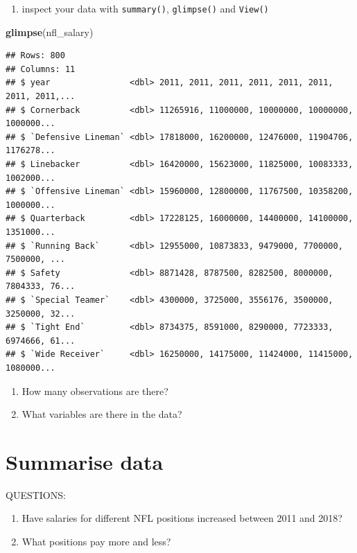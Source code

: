 \documentclass[
]{book}
\newenvironment{Shaded}{\begin{snugshade}}{\end{snugshade}}
\newcommand{\KeywordTok}[1]{\textcolor[rgb]{0.13,0.29,0.53}{\textbf{#1}}}
\newcommand{\NormalTok}[1]{#1}
\providecommand{\tightlist}{%
  \setlength{\itemsep}{0pt}\setlength{\parskip}{0pt}}
\begin{document}
\begin{enumerate}
\def\labelenumi{\arabic{enumi}.}
\setcounter{enumi}{3}
\tightlist
\item
  inspect your data with \texttt{summary()}, \texttt{glimpse()} and \texttt{View()}
\end{enumerate}

\begin{Shaded}
\begin{Highlighting}[]
\KeywordTok{glimpse}\NormalTok{(nfl_salary)}
\end{Highlighting}
\end{Shaded}

\begin{verbatim}
## Rows: 800
## Columns: 11
## $ year                <dbl> 2011, 2011, 2011, 2011, 2011, 2011, 2011, 2011,...
## $ Cornerback          <dbl> 11265916, 11000000, 10000000, 10000000, 1000000...
## $ `Defensive Lineman` <dbl> 17818000, 16200000, 12476000, 11904706, 1176278...
## $ Linebacker          <dbl> 16420000, 15623000, 11825000, 10083333, 1002000...
## $ `Offensive Lineman` <dbl> 15960000, 12800000, 11767500, 10358200, 1000000...
## $ Quarterback         <dbl> 17228125, 16000000, 14400000, 14100000, 1351000...
## $ `Running Back`      <dbl> 12955000, 10873833, 9479000, 7700000, 7500000, ...
## $ Safety              <dbl> 8871428, 8787500, 8282500, 8000000, 7804333, 76...
## $ `Special Teamer`    <dbl> 4300000, 3725000, 3556176, 3500000, 3250000, 32...
## $ `Tight End`         <dbl> 8734375, 8591000, 8290000, 7723333, 6974666, 61...
## $ `Wide Receiver`     <dbl> 16250000, 14175000, 11424000, 11415000, 1080000...
\end{verbatim}

\begin{enumerate}
\def\labelenumi{\arabic{enumi}.}
\setcounter{enumi}{4}
\item
  How many observations are there?
\item
  What variables are there in the data?
\end{enumerate}

\hypertarget{summarise-data}{%
\section{Summarise data}\label{summarise-data}}

QUESTIONS:

\begin{enumerate}
\def\labelenumi{\arabic{enumi})}
\item
  Have salaries for different NFL positions increased between 2011 and 2018?
\item
  What positions pay more and less?
\end{enumerate}
\end{document}
